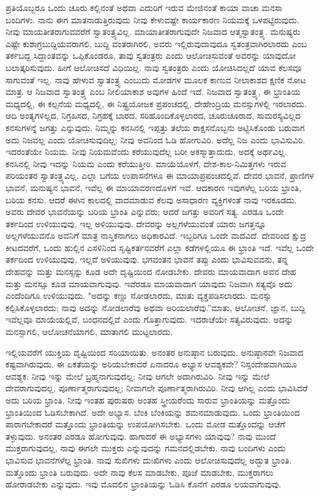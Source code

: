 ಪ್ರತಿಯೊಬ್ಬರೂ ಒಂದು ಚೂರು ಕಲ್ಲಿನಂತೆ ಅಥವಾ ಎದುರಿಗೆ ಇರುವ ಮೇಜಿನಂತೆ ಕಾಯಾ ವಾಚಾ ಮನಸಾ ಬಂದಿಗಳು. ನಾನು ಈಗ ಮಾತನಾಡುತ್ತಿರುವುದು ನೀವು ಕೇಳುವಷ್ಟೇ ಕಾರ್ಯಕಾರಣ ನಿಯಮಕ್ಕೆ ಒಳಪಟ್ಟಿರುವುದು. ನೀವು ಮಾಯತೀತರಾಗುವವರೆಗೆ ಸ್ವಾತಂತ್ರ್ಯವಿಲ್ಲ. ಮಾಯಾತೀತರಾಗುವುದೇ ನಿಜವಾದ ಆತ್ಮಸ್ವಾತಂತ್ರ್ಯ. ಮನುಷ್ಯರು ಎಷ್ಟೇ ಕುಶಾಗ್ರಬುದ್ದಿಯವರಾಗಲಿ, ಬುದ್ದಿ ವಂತರಾಗಿರಲಿ, ಅವರು ಇಲ್ಲಿರುವುದಾವುದೂ ಸ್ವತಂತ್ರವಾಗಿರಲಾರದು ಎಂಬ ತರ್ಕಬದ್ದ ಸಿದ್ದಾಂತವನ್ನು ಒಪ್ಪಿಕೊಂಡರೂ, ತಾವು ಸ್ವತಂತ್ರರು ಎಂದು ಆಲೋಚಿಸುವಂತೆ ಅವರನ್ನು ಯಾವುದೋ ಬಲಾತ್ಕರಿಸುವುದು. ಹೀಗೆ ಆಲೋಚಿಸದೆ ವಿಧಿಯಿಲ್ಲ. ನಾವು ಸ್ವತಂತ್ರರು ಎಂದು ಯೋಚಿಸಿದಲ್ಲದೆ ಯಾವ ಕೆಲಸವೂ ಸಾಗುವಂತೆ ಇಲ್ಲ. ನಾವು ಹೇಳುವ ಸ್ವಾತಂತ್ರ್ಯ ಎಂಬುದು ಮೋಡಗಳ ಮೂಲಕ ಕಾಣುವ ನೀಲಾಕಾಶದ ಕ್ಷಣಿಕ ನೋಟ ಮಾತ್ರ. ಆ ನಿಜವಾದ ಸ್ವಾತಂತ್ರ್ಯ ಎಂಬ ನೀಲಿಯಾಕಾಶ ಅವುಗಳ ಹಿಂದೆ ಇದೆ. ನಿಜವಾದ ಸ್ವಾತಂತ್ರ್ಯ, ಈ ಭ್ರಾಂತಿಯ ಮಧ್ಯದಲ್ಲಿ, ಈ ಕಲ್ಪನೆಯ ಮಧ್ಯದಲ್ಲಿ, ಈ ನಿಷ್ಟ್ರಯೋಜಕ ಪ್ರಪಂಚದಲ್ಲಿ, ದೇಹೇಂದ್ರಿಯ ಮನಸ್ಸುಗಳಲ್ಲಿ ಇರಲಾರದು. ಆದಿ ಅಂತ್ಯಗಳಿಲ್ಲದ, ನಿಗ್ರಹಿಸದ, ನಿಗ್ರಹಕ್ಕೆ ಬಾರದ, ಸರಿಹೊಂದಿಕೊಳ್ಳಲಾರದ, ಚೂರುಚೂರಾದ, ಸಾಮರಸ್ಯವಿಲ್ಲದ ಕನಸುಗಳನ್ನೆ ಜಗತ್ತು ಎನ್ನುವುದು. ನಿಮ್ಮನ್ನು ಕನಸಿನಲ್ಲಿ ಇಪ್ಪತ್ತು ತಲೆಯ ರಾಕ್ಷಸನೊಬ್ಬನು ಅಟ್ಟಿಸಿಕೊಂಡು ಬರುವಾಗ ಅದು ನಿಜವಲ್ಲ ಎಂದು ಯೋಚಿಸುವುದಿಲ್ಲ; ನೀವು ಅವನಿಂದ ಓಡಿ ಹೋಗುವಿರಿ. ಅದೆಲ್ಲ ನಿಜ ಎಂದು ಭಾವಿಸುವಿರಿ. ಇದರಂತೆಯೇ ನಿಯಮ. ನೀವು ನಿಯಮವೆಂದು ಕರೆಯುವುದೆಲ್ಲ ಬರೀ ಅಕಸ್ಮಾತ್ತಾದುದು, ಅದಕ್ಕೆ ಅರ್ಥವಿಲ್ಲ. ಕನಸಿನಲ್ಲಿ ನೀವು ಇದನ್ನು ನಿಯಮ ಎಂದು ಕರೆಯುತ್ತೀರಿ. ಮಾಯೆಯೊಳಗೆ, ದೇಶ-ಕಾಲ-ನಿಮಿತ್ತಗಳು ಇರುವ ಪರಿಯಂತರ ಸ್ವಾತಂತ್ರ್ಯವಿಲ್ಲ. ಎಲ್ಲಾ ಬಗೆಯ ಉಪಾಸನೆಗಳೂ ಈ ಮಾಯಾಪ್ರಪಂಚದಲ್ಲಿವೆ. ದೇವರ ಭಾವನೆ, ಪ್ರಾಣಿಗಳ ಭಾವನೆ, ಮನುಷ್ಯನ ಭಾವನೆ, ಇವೆಲ್ಲ ಈ ಮಾಯಾವರಣದೊಳಗೆ ಇವೆ. ಆದಕಾರಣ ಇವುಗಳೆಲ್ಲ ಬರಿಯ ಭ್ರಾಂತಿ, ಬರಿಯ ಕನಸು. ಆದರೆ ಈಗಿನ ಕಾಲದಲ್ಲಿ ವಾದಮಾಡುವ ಕೆಲವು ಅಸಾಧಾರಣ ವ್ಯಕ್ತಿಗಳಂತೆ ನಾವು ಇರಕೂಡದು. ಅವರು ದೇವರ ಭಾವನೆಯನ್ನು ಬರಿಯ ಭ್ರಾಂತಿ ಎನ್ನುವರು; ಆದರೆ ಜಗತ್ತು ಅವರಿಗೆ ಸತ್ಯ. ಎರಡೂ ಒಂದೇ ತರ್ಕದಿಂದ ಉಳಿಯುವುವು, ಇಲ್ಲ ಅಳಿಯುವುವು. ದೇವರನ್ನು ಅಲ್ಲಗಳೆಯುವಂತೆ ಯಾರು ಜಗತ್ತನ್ನೂ ಅಲ್ಲಗಳೆಯುವನೊ ಅವನಿಗೆ ಮಾತ್ರ ನಾಸ್ತಿಕನಾಗಲು ಅಧಿಕಾರವಿದೆ. ಇಬ್ಬರಿಗೂ ಒಂದೇ ವಾದವಿದೆ. ದೇವರಿಂದ ಕ್ಷುದ್ರ ಕೀಟದವರೆಗೆ, ಒಂದು ಹುಲ್ಲಿನ ಎಸಳಿನಿಂದ ಸೃಷ್ಟಿಕರ್ತನವರೆಗೆ ಎಲ್ಲಾ ಕಡೆಗಳಲ್ಲಿಯೂ ಈ ಭ್ರಾಂತಿ ಇದೆ. ಇವೆಲ್ಲ ಒಂದೇ ತರ್ಕದಿಂದ ಉಳಿಯುವುವು, ಇಲ್ಲವೆ ಅಳಿಯುವುವು. ಭಗವಂತನ ಭಾವನೆ ತಪ್ಪು ಎಂದು ಭಾವಿಸುವವನು, ತನ್ನ ದೇಹವನ್ನು ಮತ್ತು ಮನಸ್ಸನ್ನು ಕೂಡ ಅದೇ ದೃಷ್ಟಿಯಿಂದ ನೋಡಬೇಕು. ದೇವರು ಮಾಯವಾದಾಗ ಅವನ ದೇಹ ಮತ್ತು ಮನಸ್ಸೂ ಕೂಡ ಮಾಯವಾಗುವುವು. ಇವೆರಡೂ ಮಾಯವಾದಾಗ ಯಾವುದು ನಿಜವಾಗಿ ಸತ್ಯವೊ ಅದು ಎಂದೆಂದಿಗೂ ಉಳಿಯುವುದು. "ಅದನ್ನು ಕಣ್ಣು ನೋಡಲಾರದು, ಮಾತು ವ್ಯಕ್ತಪಡಿಸಲಾರದು. ಮನಸ್ಸು ಕಲ್ಪಿಸಿಕೊಳ್ಳಲಾರದು; ನಾವು ಅದನ್ನು ನೋಡಲಾರೆವು ಅಥವಾ ಅರಿಯಲಾರೆವು.''ಮಾತು, ಆಲೋಚನೆ, ಜ್ಞಾನ, ಬುದ್ದಿ ಇವೆಲ್ಲವೂ ಮಾಯೆಯಲ್ಲಿವೆ, ಬಂಧನದಲ್ಲಿವೆ ಎಂದು ಗೊತ್ತಾಗುವುದು. ಇದರಾಚೆಯೇ ಸತ್ಯವಿರುವುದು. ಅದನ್ನು ಮನಸ್ಸಾಗಲಿ, ಆಲೋಚನೆಯಾಗಲಿ, ಮಾತಾಗಲಿ ಮುಟ್ಟಲಾರದು.

ಇಲ್ಲಿಯವರೆಗೆ ಯುಕ್ತಿಯ ದೃಷ್ಟಿಯಿಂದ ಸರಿಯಾಯಿತು. ಅನಂತರ ಅನುಷ್ಠಾನ ಬರುವುದು. ಅನುಷ್ಠಾನವೇ ನಿಜವಾದ ಕಷ್ಟವಾಗಿರುವುದು. ಈ ಏಕತೆಯನ್ನು ಅರಿಯಬೇಕಾದರೆ ಏನಾದರೂ ಅಭ್ಯಾಸ ಆವಶ್ಯಕವೇ? ನಿಸ್ಸಂದೇಹವಾಗಿಯೂ ಆವಶ್ಯಕ. ನೀವು ಇನ್ನು ಮೇಲೆ ಬ್ರಹ್ಮನಾಗುವುದಲ್ಲ; ನೀವು ಆಗಲೇ ಅದಾಗಿರುವಿರಿ. ನೀವು ಇನ್ನು ಮೇಲೆ ದೇವರಾಗುವುದಲ್ಲ, ಪೂರ್ಣಾತ್ಮರಾಗುವುದಲ್ಲ; ನೀವಾಗಲೇ ಪೂರ್ಣಾತ್ಮರಾಗಿರುವಿರಿ. ನೀವು ಆಗಿಲ್ಲ ಎಂದು ಭಾವಿಸಿದರೆ ಅದು ಬರಿಯ ಭ್ರಾಂತಿ. ನೀವು ಇಂತಹ ಪುರುಷರು ಅಂತಹ ಸ್ತ್ರೀಯರೆಂದು ಸಾರುವ ಭ್ರಾಂತಿಯನ್ನು ಮತ್ತೊಂದು ಭ್ರಾಂತಿಯಿಂದ ಓಡಿಸಬೇಕಾಗಿದೆ. ಅದೇ ಅಭ್ಯಾಸ. ಬೆಂಕಿ ಬೆಂಕಿಯನ್ನು ಶಮನಮಾಡುವುದು. ಒಂದು ಭ್ರಾಂತಿಯಿಂದ ಪಾರಾಗಬೇಕಾದರೆ ಮತ್ತೊಂದು ಭ್ರಾಂತಿಯನ್ನು ಉಪಯೋಗಿಸಬೇಕು. ಒಂದು ಮೋಡ ಮತ್ತೊಂದನ್ನು ಆಚೆಗೆ ತಳ್ಳುವುದು. ಅನಂತರ ಎರಡೂ ಹೋಗುವುವು. ಹಾಗಾದರೆ ಈ ಅಭ್ಯಾಸಗಳು ಯಾವುವು? ನಾವು ಮುಂದೆ ಮುಕ್ತರಾಗುವುದಲ್ಲ, ನಾವು ಈಗಲೇ ಮುಕ್ತರು ಎನ್ನುವುದನ್ನು ಗಮನದಲ್ಲಿಡಬೇಕು. ನಾವು ಬಂದಿಗಳು ಎಂದು ಭಾವಿಸುವ ಭಾವನೆಗಳೆಲ್ಲ ಭ್ರಾಂತಿ. ನಾವು ಸುಖಿಗಳು ದುಃಖಿಗಳು ಎಂದು ಆಲೋಚಿಸುವುದೆಲ್ಲ ಅದ್ಭುತ ಭ್ರಾಂತಿ. ಮತ್ತೊಂದು ಭ್ರಾಂತಿ ಬರುವುದು. ಅದೇ ನಾವು ಕೆಲಸ ಮಾಡಬೇಕು, ಪೂಜೆ ಮಾಡಬೇಕು, ಮುಕ್ತರಾಗಲು ಹೋರಾಡಬೇಕು ಎನ್ನುವುದು. ಇವು ಮೊದಲಿನ ಭ್ರಾಂತಿಯನ್ನು ಓಡಿಸಿ ಕೊನೆಗೆ ಎರಡೂ ಲಯವಾಗುವುವು.

